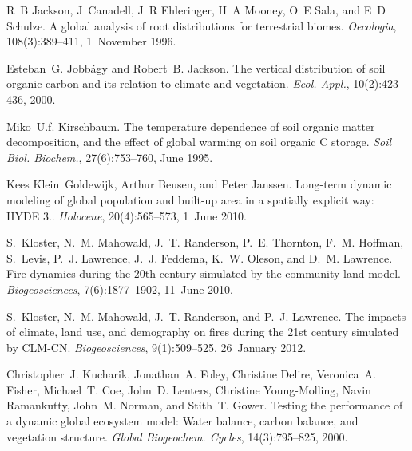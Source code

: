 \begin{DoxyDescription}
\item[\label{_CITEREF_Jackson1996-va}%
\mbox{[}42\mbox{]}]R~B Jackson, J~Canadell, J~R Ehleringer, H~A Mooney, O~E Sala, and E~D Schulze. A global analysis of root distributions for terrestrial biomes. {\itshape Oecologia}, 108(3)\+:389--411, 1~November 1996. 


\item[\label{_CITEREF_Jobbagy2000-pa}%
\mbox{[}43\mbox{]}]Esteban~G. Jobbágy and Robert~B. Jackson. The vertical distribution of soil organic carbon and its relation to climate and vegetation. {\itshape Ecol. Appl.}, 10(2)\+:423--436, 2000. 


\item[\label{_CITEREF_Kirschbaum1995-db}%
\mbox{[}44\mbox{]}]Miko~U.\+f. Kirschbaum. The temperature dependence of soil organic matter decomposition, and the effect of global warming on soil organic C storage. {\itshape Soil Biol. Biochem.}, 27(6)\+:753--760, June 1995. 


\item[\label{_CITEREF_Klein_Goldewijk2010-lh}%
\mbox{[}45\mbox{]}]Kees Klein~Goldewijk, Arthur Beusen, and Peter Janssen. Long-\/term dynamic modeling of global population and built-\/up area in a spatially explicit way\+: H\+Y\+D\+E 3.. {\itshape Holocene}, 20(4)\+:565--573, 1~June 2010. 


\item[\label{_CITEREF_Kloster2010-633}%
\mbox{[}46\mbox{]}]S.~Kloster, N.~M. Mahowald, J.~T. Randerson, P.~E. Thornton, F.~M. Hoffman, S.~Levis, P.~J. Lawrence, J.~J. Feddema, K.~W. Oleson, and D.~M. Lawrence. Fire dynamics during the 20th century simulated by the community land model. {\itshape Biogeosciences}, 7(6)\+:1877--1902, 11~June 2010. 


\item[\label{_CITEREF_Kloster2012-c79}%
\mbox{[}47\mbox{]}]S.~Kloster, N.~M. Mahowald, J.~T. Randerson, and P.~J. Lawrence. The impacts of climate, land use, and demography on fires during the 21st century simulated by C\+L\+M-\/\+C\+N. {\itshape Biogeosciences}, 9(1)\+:509--525, 26~January 2012. 


\item[\label{_CITEREF_Kucharik2000-xk}%
\mbox{[}48\mbox{]}]Christopher~J. Kucharik, Jonathan~A. Foley, Christine Delire, Veronica~A. Fisher, Michael~T. Coe, John~D. Lenters, Christine Young-\/\+Molling, Navin Ramankutty, John~M. Norman, and Stith~T. Gower. Testing the performance of a dynamic global ecosystem model\+: Water balance, carbon balance, and vegetation structure. {\itshape Global Biogeochem. Cycles}, 14(3)\+:795--825, 2000. 



\end{DoxyDescription}
